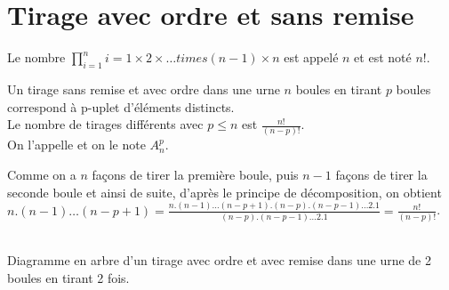 \documentclass{book}
\begin{document}
\section{Tirage avec ordre et sans remise}
\begin{Definition}[Factoriel] Le nombre $\prod_{i=1}^ni= 1\times 2\times \dots  times (n-1)\times n$ est appelé  $n$ et
est noté $n!$.
\end{Definition}
\begin{DefinitionProposition}[Arrangement]\label{proparran}
Un tirage sans remise et avec ordre dans une urne $n$ boules en tirant $p$ boules correspond à p-uplet d'éléments distincts.\\
Le nombre de tirages différents  avec $p\leq n$  est $\frac{n!}{(n-p)!}$.\\
 On l'appelle   et on le note $A^p_n$.
\end{DefinitionProposition}
\begin{Demonstration} Comme on a $n$ façons de tirer la première boule, puis $n-1$ façons de tirer la seconde boule et ainsi de suite, d'après le principe de décomposition, on obtient $n.(n-1)\dots(n-p+1)=\frac{n.(n-1)\dots(n-p+1).(n-p).(n-p-1)\dots 2.1}{(n-p).(n-p-1)\dots 2.1}=\frac{n!}{(n-p)!}$.
\begin{center}
\\
Diagramme en arbre d'un tirage avec ordre et avec remise  dans une urne de 2 boules en tirant 2 fois.
\end{center}
\end{Demonstration}
\end{document}
